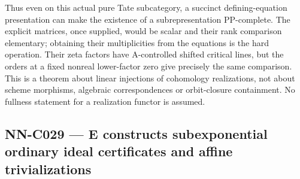 Thus even on this actual pure Tate subcategory, a succinct defining-equation presentation can make the existence of a subrepresentation PP-complete. The explicit matrices, once supplied, would be scalar and their rank comparison elementary; obtaining their multiplicities from the equations is the hard operation. Their zeta factors have A-controlled shifted critical lines, but the orders at a fixed nonreal lower-factor zero give precisely the same comparison. This is a theorem about linear injections of cohomology realizations, not about scheme morphisms, algebraic correspondences or orbit-closure containment. No fullness statement for a realization functor is assumed.

\subsection{NN-C029 --- E constructs subexponential ordinary ideal certificates and affine trivializations}
